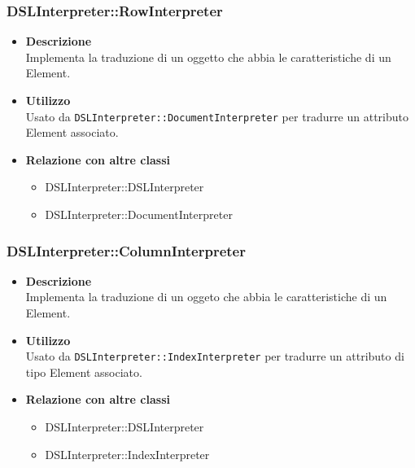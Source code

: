 \subsubsection{DSLInterpreter::RowInterpreter}
\begin{itemize}
\item \textbf{Descrizione} \hfill \\
Implementa la traduzione di un oggetto che abbia le caratteristiche di un  Element.
\item \textbf{Utilizzo} \hfill \\
Usato da \texttt{DSLInterpreter::DocumentInterpreter} per tradurre un attributo  Element associato.
\item \textbf{Relazione con altre classi}  
\begin{itemize}
\item DSLInterpreter::DSLInterpreter
\item DSLInterpreter::DocumentInterpreter
\end{itemize}
\end{itemize}

\subsubsection{DSLInterpreter::ColumnInterpreter}
\begin{itemize}
\item \textbf{Descrizione} \hfill \\
Implementa la traduzione di un oggeto che abbia le caratteristiche di un  Element.
\item \textbf{Utilizzo} \hfill \\
Usato da \texttt{DSLInterpreter::IndexInterpreter} per tradurre un attributo di tipo  Element associato.
\item \textbf{Relazione con altre classi}
\begin{itemize}
\item DSLInterpreter::DSLInterpreter
\item DSLInterpreter::IndexInterpreter
\end{itemize}
\end{itemize}

